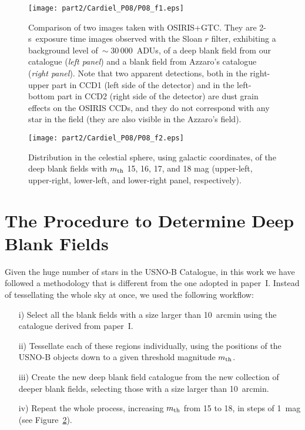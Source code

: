 \begin{figure}
\centerline{%
\texttt{[image: part2/Cardiel\_P08/P08\_f1.eps]}}
\caption{Comparison of two images taken with OSIRIS+GTC. They are \mbox{2-s exposure} time images observed with the Sloan $r$ filter, exhibiting a background level of$~\sim 30\,000$~ADUs, of a deep blank field from our catalogue (\emph{left panel}) and a blank field from Azzaro's catalogue (\emph{right panel}). Note that two apparent detections, both in the right-upper part in CCD1 (left side of the detector) and in the left-bottom part in CCD2 (right side of the detector) are dust grain effects on the OSIRIS CCDs, and they do not correspond with any star in the field (they are also visible in the Azzaro's field).}
\label{example_DBF}
\end{figure}

\begin{figure}
\centerline{%
\texttt{[image: part2/Cardiel\_P08/P08\_f2.eps]}}
\caption{Distribution in the celestial sphere, using galactic coordinates, of the deep blank fields with $m_{\mbox{\scriptsize th}}$ 15, 16, 17, and 18 mag (upper-left, upper-right, lower-left, and lower-right panel, respectively).}
\label{result_DBF}
\end{figure}


\section{The Procedure to Determine Deep Blank Fields}

Given the huge number of stars in the USNO-B Catalogue, in this work we have followed a methodology that is different from the one adopted in paper~I. Instead of tessellating the whole sky at once, we used the following workflow:
\begin{itemize}
  \item[i)] Select all the blank fields with a size larger than 10~arcmin using
  the catalogue derived from paper~I.
  \item[ii)] Tessellate each of these regions individually, using the positions
  of the USNO-B objects down to a given threshold magnitude
  $m_{\mbox{\scriptsize th}}$.
  \item[iii)] Create the new deep blank field catalogue from the new collection
  of deeper blank fields, selecting those with a size larger than 10~arcmin.
  \item[iv)] Repeat the whole process, increasing 
  $m_{\mbox{\scriptsize th}}$ from 15 to 18, in steps of 1~mag (see
  Figure~\ref{result_DBF}).
\end{itemize}

